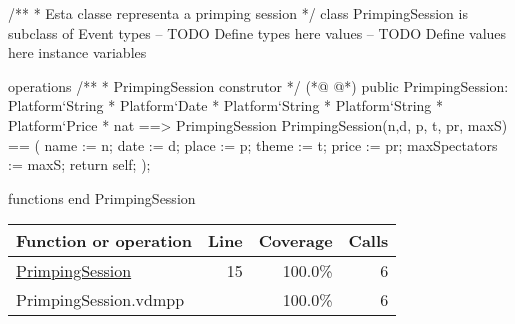 \begin{vdmpp}[breaklines=true]
/**
* Esta classe representa a primping session
*/
class PrimpingSession is subclass of Event
types
-- TODO Define types here
values
-- TODO Define values here
instance variables
 
operations
 /**
 * PrimpingSession construtor
 */
(*@
\label{PrimpingSession:15}
@*)
 public PrimpingSession: Platform`String * Platform`Date * Platform`String *  Platform`String * Platform`Price * nat ==> PrimpingSession 
  PrimpingSession(n,d, p, t, pr,  maxS) == 
  (
   name := n;
   date := d;
   place := p;
   theme := t;
   price := pr;
   maxSpectators := maxS;
   return self;
  );
 
 
  
functions
end PrimpingSession
\end{vdmpp}
\bigskip
\begin{longtable}{|l|r|r|r|}
\hline
Function or operation & Line & Coverage & Calls \\
\hline
\hline
\hyperref[PrimpingSession:15]{PrimpingSession} & 15&100.0\% & 6 \\
\hline
\hline
PrimpingSession.vdmpp & & 100.0\% & 6 \\
\hline
\end{longtable}

